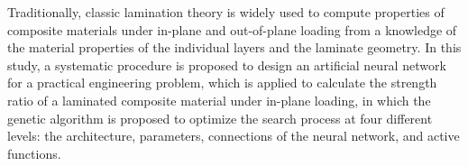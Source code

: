 Traditionally, classic lamination theory is widely used to compute
properties of composite materials under in-plane and out-of-plane loading from
a knowledge of the material properties of the individual layers and the
laminate geometry. In this study, a systematic procedure is proposed to design
an artificial neural network for a practical engineering problem, which is
applied to calculate the strength ratio of a laminated composite material under
in-plane loading, in which the genetic algorithm is proposed to optimize the search
process at four different levels: the architecture, parameters, connections of
the neural network, and active functions. 
